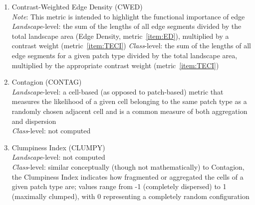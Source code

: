 \begin{itemize}
\begin{enumerate}
		\item Contrast-Weighted Edge Density (CWED)\\
		\emph{Note}: This metric is intended to highlight the functional importance of edge	\\
		\emph{Landscape}-level: the sum of the lengths of all edge segments divided by the total landscape area (Edge Density, metric~\ref{item:ED}), multiplied by a contrast weight (metric~\ref{item:TECI})
		\emph{Class}-level: the sum of the lengths of all edge segments for a given patch type divided by the total landscape area, multiplied by the appropriate contrast weight (metric~\ref{item:TECI})  	\\

		\item Contagion (CONTAG)\\
		\emph{Landscape}-level: a cell-based (as opposed to patch-based) metric that measures the likelihood of a given cell belonging to the same patch type as a randomly chosen adjacent cell and is a common measure of both aggregation and dispersion 	\\
		\emph{Class}-level: not computed \\ 	
		
		\item Clumpiness Index (CLUMPY)\\
		\emph{Landscape}-level: not computed  	\\
		\emph{Class}-level: similar conceptually (though not mathematically) to Contagion, the Clumpiness Index indicates how fragmented or aggregated the cells of a given patch type are; values range from -1 (completely dispersed) to 1 (maximally clumped), with 0 representing a completely random configuration 	\\
		

\end{enumerate}
\end{itemize}
